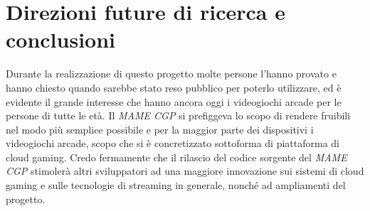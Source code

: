 %
%

\chapter*{Direzioni future di ricerca e conclusioni}


Durante la realizzazione di questo progetto molte persone l'hanno provato e hanno chiesto quando sarebbe stato reso pubblico per poterlo utilizzare, ed è evidente il grande interesse che hanno ancora oggi i videogiochi arcade per le persone di tutte le età. Il \textit{MAME CGP} si prefiggeva lo scopo di rendere fruibili nel modo più semplice possibile e per la maggior parte dei dispositivi i videogiochi arcade, scopo che si è concretizzato sottoforma di piattaforma di cloud gaming. Credo fermamente che il rilascio del codice sorgente del \textit{MAME CGP} stimolerà altri sviluppatori ad una maggiore innovazione sui sistemi di cloud gaming e sulle tecnologie di streaming in generale, nonché ad ampliamenti del progetto.

